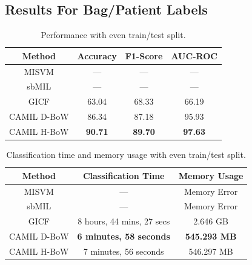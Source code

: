 

\subsection{Results For Bag/Patient Labels}

\begin{table}[h]
\begin{center} 
\caption{Performance with even train/test split.} 
\label{tab:even-comp}
\begin{tabular}{|c|ccc|}\hline
Method & Accuracy & F1-Score & AUC-ROC\\\hline
MISVM & --- & --- & ---\\\hline
sbMIL & --- & --- & ---\\\hline
GICF & 63.04 & 68.33 & 66.19\\\hline %
CAMIL D-BoW & 86.34 & 87.18 & 95.93\\\hline
CAMIL H-BoW & \bf{90.71} & \bf{89.70} & \bf{97.63}\\\hline
\end{tabular}
\end{center}
\end{table}

\begin{table}[h]
\begin{center}
\caption{Classification time and memory usage with even train/test split.} 
\label{tab:time-comp}
\begin{tabular}{|c|cc|}\hline
Method & Classification Time & Memory Usage\\\hline
MISVM & --- & Memory Error\\\hline
sbMIL & --- & Memory Error\\\hline
GICF & 8 hours, 44 mins, 27 secs & 2.646 GB\\\hline
CAMIL D-BoW & \bf{6 minutes, 58 seconds} & \bf{545.293 MB}\\\hline
CAMIL H-BoW & 7 minutes, 56 seconds & 546.297 MB\\\hline
\end{tabular}
\end{center}
\end{table}

